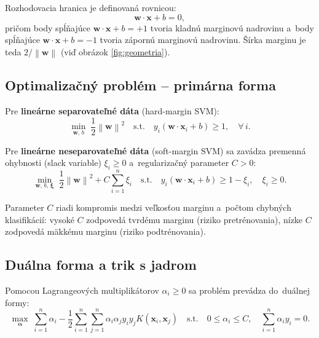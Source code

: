 \documentclass[12pt,a4paper]{article}
\newcommand{\norm}[1]{\left\lVert#1\right\rVert}
\begin{document}
Rozhodovacia hranica je definovaná rovnicou:
\begin{equation}
  \mathbf{w} \cdot \mathbf{x} + b = 0,
\end{equation}
pričom body spĺňajúce $\mathbf{w} \cdot \mathbf{x} + b = +1$ tvoria kladnú
marginovú nadrovinu a~body spĺňajúce $\mathbf{w} \cdot \mathbf{x} + b = -1$
tvoria zápornú marginovú nadrovinu. Šírka marginu je teda $2/\norm{\mathbf{w}}$
(viď obrázok \ref{fig:geometria}).

\subsection{Optimalizačný problém -- primárna forma}

Pre \textbf{lineárne separovateľné dáta} (hard-margin SVM):
\begin{equation}
  \min_{\mathbf{w},\,b} \;\frac{1}{2}\norm{\mathbf{w}}^2
  \quad \text{s.t.} \quad
  y_i(\mathbf{w} \cdot \mathbf{x}_i + b) \geq 1, \quad \forall\, i.
\end{equation}

Pre \textbf{lineárne neseparovateľné dáta} (soft-margin SVM) sa zavádza
premenná ohybnosti (slack variable) $\xi_i \geq 0$ a~regularizačný
parameter $C > 0$:
\begin{equation}
  \min_{\mathbf{w},\,b,\,\boldsymbol{\xi}} \;\frac{1}{2}\norm{\mathbf{w}}^2
  + C\sum_{i=1}^{n} \xi_i
  \quad \text{s.t.} \quad
  y_i(\mathbf{w} \cdot \mathbf{x}_i + b) \geq 1 - \xi_i,\quad \xi_i \geq 0.
\end{equation}

Parameter $C$ riadi kompromis medzi veľkosťou marginu a~počtom chybných
klasifikácií: vysoké $C$ zodpovedá tvrdému marginu (riziko pretrénovania),
nízke $C$ zodpovedá mäkkému marginu (riziko podtrénovania).

\subsection{Duálna forma a trik s jadrom}

Pomocou Lagrangeových multiplikátorov $\alpha_i \geq 0$ sa problém prevádza
do~duálnej formy:
\begin{equation}
  \max_{\boldsymbol{\alpha}} \;\sum_{i=1}^{n}\alpha_i
  - \frac{1}{2}\sum_{i=1}^{n}\sum_{j=1}^{n}
    \alpha_i\alpha_j y_i y_j K(\mathbf{x}_i, \mathbf{x}_j)
  \quad \text{s.t.} \quad
  0 \leq \alpha_i \leq C,\quad \sum_{i=1}^{n}\alpha_i y_i = 0.
\end{equation}
\end{document}
